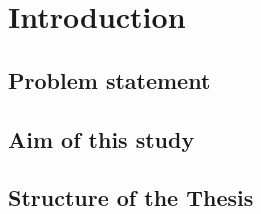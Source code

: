 \chapter{Introduction}
\label{chapter:intro}


\section{Problem statement}

\section{Aim of this study}

\section{Structure of the Thesis}
\label{section:structure} 


